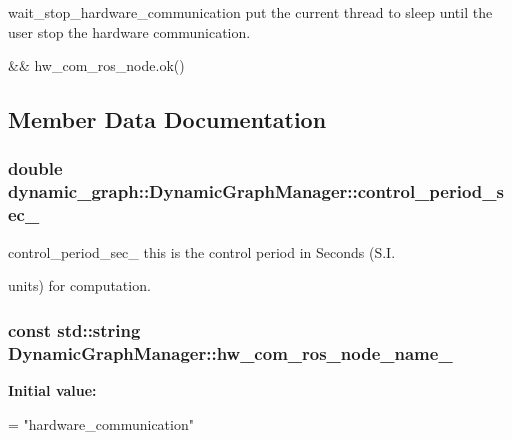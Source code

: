 wait\+\_\+stop\+\_\+hardware\+\_\+communication put the current thread to sleep until the user stop the hardware communication. 

\&\& hw\+\_\+com\+\_\+ros\+\_\+node.\+ok() 

\subsection{Member Data Documentation}
\subsubsection[{\texorpdfstring{control\+\_\+period\+\_\+sec\+\_\+}{control_period_sec_}}]{\setlength{\rightskip}{0pt plus 5cm}double dynamic\+\_\+graph\+::\+Dynamic\+Graph\+Manager\+::control\+\_\+period\+\_\+sec\+\_\+\hspace{0.3cm}{\ttfamily [protected]}}\hypertarget{classdynamic__graph_1_1DynamicGraphManager_a2c0f1323534e9e1b17f3b1cc23f0c7f1}{}\label{classdynamic__graph_1_1DynamicGraphManager_a2c0f1323534e9e1b17f3b1cc23f0c7f1}


control\+\_\+period\+\_\+sec\+\_\+ this is the control period in Seconds (S.\+I. 

units) for computation. 
\subsubsection[{\texorpdfstring{hw\+\_\+com\+\_\+ros\+\_\+node\+\_\+name\+\_\+}{hw_com_ros_node_name_}}]{\setlength{\rightskip}{0pt plus 5cm}const std\+::string Dynamic\+Graph\+Manager\+::hw\+\_\+com\+\_\+ros\+\_\+node\+\_\+name\+\_\+\hspace{0.3cm}{\ttfamily [static]}}\hypertarget{classdynamic__graph_1_1DynamicGraphManager_a415f24927dbe9dfd0ee4a6462428bd48}{}\label{classdynamic__graph_1_1DynamicGraphManager_a415f24927dbe9dfd0ee4a6462428bd48}
{\bfseries Initial value\+:}
\begin{DoxyCode}
=
    \textcolor{stringliteral}{"hardware\_communication"}
\end{DoxyCode}


